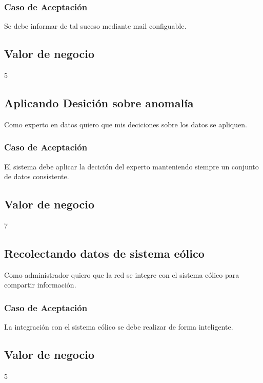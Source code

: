 \subsubsection*{Caso de Aceptación}
Se debe informar de tal suceso mediante mail configuable.
\subsection*{Valor de negocio}
5


\linea \subsection*{Aplicando Desición sobre anomalía}
Como experto en datos quiero que mis deciciones sobre los datos se apliquen.
\subsubsection*{Caso de Aceptación}
El sistema debe aplicar la decición del experto manteniendo siempre un conjunto de datos consistente.
\subsection*{Valor de negocio}
7


\linea \subsection*{Recolectando datos de sistema eólico}
Como administrador quiero que la red se integre con el sistema eólico para compartir información.
\subsubsection*{Caso de Aceptación}
La integración con el sistema eólico se debe realizar de forma inteligente.
\subsection*{Valor de negocio}
5


